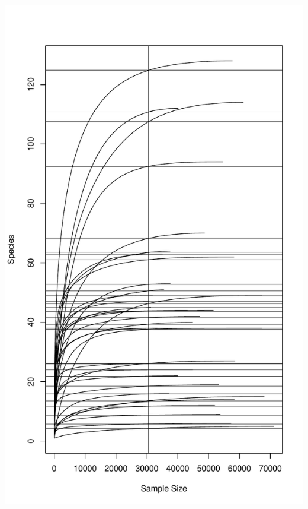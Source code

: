 \documentclass[
]{article}
\begin{document}
\includegraphics[width=1\linewidth]{manuscript_template_files/figure-latex/unnamed-chunk-24-3}
\end{document}
